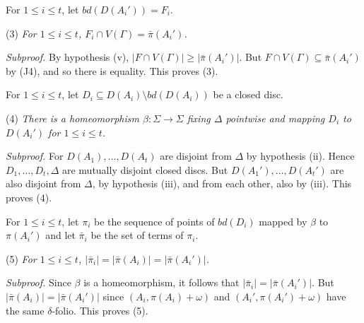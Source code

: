 For $1 \le i \le t$, let $bd(D(A_i')) = F_i$.

\hspace*{12pt}(3) \textit{For $1 \le i \le t$, $F_i \cap V(\Gamma) = \bar{\pi}(A_i')$.}

\textit{Subproof.} By hypothesis (v), $|F \cap V(\Gamma)| \ge |\bar{\pi}(A_i')|$. But $F \cap V(\Gamma) \subseteq \bar{\pi}(A_i')$ by (J4), and so there is equality. This proves (3).

For $1 \le i \le t$, let $D_i \subseteq D(A_i) \setminus bd(D(A_i))$ be a closed disc.

\hspace*{12pt}(4) \textit{There is a homeomorphism $\beta : \Sigma \to \Sigma$ fixing $\Delta$ pointwise and mapping $D_i$ to $D(A_i')$ for $1 \le i \le t$.}

\textit{Subproof.} For $D(A_1), \dots, D(A_t)$ are disjoint from $\Delta$ by hypothesis (ii). Hence $D_1, \dots, D_t, \Delta$ are mutually disjoint closed discs. But $D(A_1'), \dots, D(A_t')$ are also disjoint from $\Delta$, by hypothesis (iii), and from each other, also by (iii). This proves (4).

For $1 \le i \le t$, let $\pi_i$ be the sequence of points of $bd(D_i)$ mapped by $\beta$ to $\pi(A_i')$ and let $\bar{\pi}_i$ be the set of terms of $\pi_i$.

\hspace*{12pt}(5) \textit{For $1 \le i \le t$, $|\bar{\pi}_i| = |\bar{\pi}(A_i)| = |\bar{\pi}(A_i')|$.}

\textit{Subproof.} Since $\beta$ is a homeomorphism, it follows that $|\bar{\pi}_i| = |\bar{\pi}(A_i')|$. But $|\bar{\pi}(A_i)| = |\bar{\pi}(A_i')|$ since $(A_i, \pi(A_i) + \omega)$ and $(A_i', \pi(A_i') + \omega)$ have the same $\delta$-folio. This proves (5).
